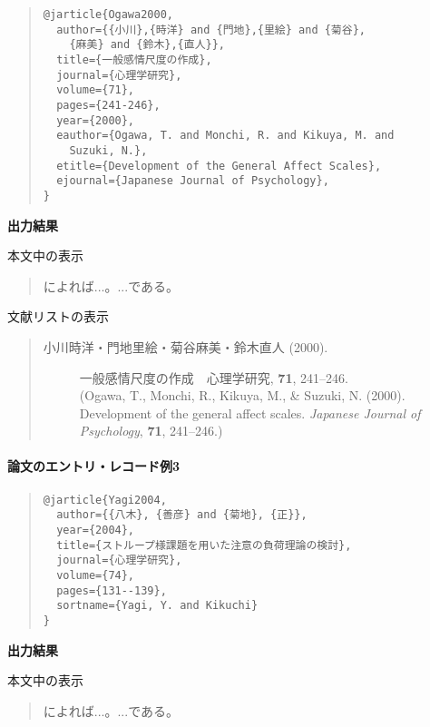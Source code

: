 \documentclass[12pt]{ltjsarticle}
\begin{document}
\begin{quote}
\begin{verbatim}
@jarticle{Ogawa2000,
  author={{小川},{時洋} and {門地},{里絵} and {菊谷},
    {麻美} and {鈴木},{直人}},
  title={一般感情尺度の作成},
  journal={心理学研究},
  volume={71},
  pages={241-246},
  year={2000},
  eauthor={Ogawa, T. and Monchi, R. and Kikuya, M. and 
    Suzuki, N.},
  etitle={Development of the General Affect Scales},
  ejournal={Japanese Journal of Psychology},
}
\end{verbatim}
\end{quote}


\textbf{出力結果}

本文中の表示
\begin{quote}
\textcite{Ogawa2000}によれば...。...である\parencite{Ogawa2000}。
\end{quote}


文献リストの表示

\begin{quote}
\begin{description}
  \item[\textrm{小川時洋・門地里絵・菊谷麻美・鈴木直人 (2000).}] 一般感情尺度の作成　心理学研究, \textbf{71}, 241--246.\\
(Ogawa, T., Monchi, R., Kikuya, M., \& Suzuki, N. (2000). Development of the general affect scales. \textit{Japanese Journal of Psychology}, \textbf{71}, 241--246.)\end{description}
\end{quote}


\paragraph{論文のエントリ・レコード例3}

\begin{quote}
\begin{verbatim}
@jarticle{Yagi2004,
  author={{八木}, {善彦} and {菊地}, {正}},
  year={2004},
  title={ストループ様課題を用いた注意の負荷理論の検討},
  journal={心理学研究},
  volume={74},
  pages={131--139},
  sortname={Yagi, Y. and Kikuchi}
}
\end{verbatim}
\end{quote}


\textbf{出力結果}

本文中の表示
\begin{quote}
\textcite{Yagi2004}によれば...。...である\parencite{Yagi2004}。
\end{quote}
\end{document}
